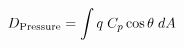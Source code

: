 \documentclass[preview]{standalone}
\begin{document}
\begin{align*}
\special{dvisvgm:raw <g id='unique000'>}D_{\text{Pressure}} = \int q \; C_p \cos\theta \; dA\special{dvisvgm:raw </g>}
\end{align*}
\end{document}
